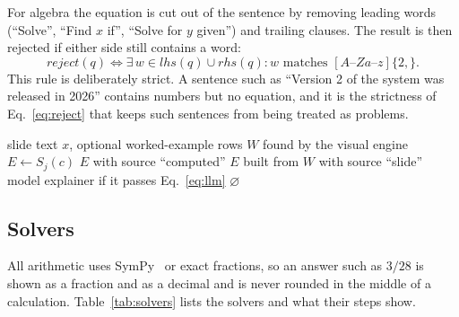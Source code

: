 \documentclass[runningheads]{llncs}
\begin{document}
For algebra the equation is cut out of the sentence by removing leading words (``Solve'', ``Find $x$ if'', ``Solve for $y$
given'') and trailing clauses. The result is then rejected if either side still contains a word:
\begin{equation}
\label{eq:reject}
\mathit{reject}(q) \iff \exists\, w \in \mathit{lhs}(q) \cup \mathit{rhs}(q) : w \text{ matches } [A\text{--}Za\text{--}z]\{2,\}.
\end{equation}
This rule is deliberately strict. A sentence such as ``Version 2 of the system was released in 2026'' contains numbers but no
equation, and it is the strictness of Eq.~\ref{eq:reject} that keeps such sentences from being treated as problems.

\begin{algorithm}[H]
\caption{Finding and solving a problem on a slide}
\label{alg:explain}
\begin{algorithmic}[1]
\Require slide text $x$, optional worked-example rows $W$ found by the visual engine
    \State $E \gets S_j(c)$ 
     \Return $E$ with source ``computed'' \EndIf
  \EndFor
\EndFor
{}
  \State \Return $E$ built from $W$ with source ``slide''
\EndIf
{} \State \Return model explainer if it passes Eq.~\ref{eq:llm} \EndIf
\State \Return $\varnothing$
\end{algorithmic}
\end{algorithm}

\subsection{Solvers}
All arithmetic uses SymPy~\cite{meurer2017} or exact fractions, so an answer such as $3/28$ is shown as a fraction and as a
decimal and is never rounded in the middle of a calculation. Table~\ref{tab:solvers} lists the solvers and what their steps show.
\end{document}
